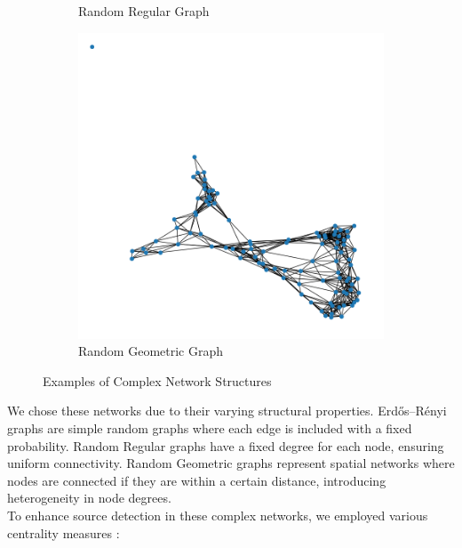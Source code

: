 \begin{figure}[H]
\begin{subfigure}{0.3\textwidth}
        \caption{Random Regular Graph}
        \label{fig:random_regular_graph}
    \end{subfigure}
    \begin{subfigure}{0.3\textwidth}
        \centering
        \includegraphics[width=\textwidth]{random_geometric_graph.png}
        \caption{Random Geometric Graph}
        \label{fig:random_geometric_graph}
    \end{subfigure}
    \caption{Examples of Complex Network Structures}
    \label{fig:network_types}
\end{figure}

We chose these networks due to their varying structural properties. Erdős–Rényi graphs are simple random graphs where each edge is included with a fixed probability. Random Regular graphs have a fixed degree for each node, ensuring uniform connectivity. Random Geometric graphs represent spatial networks where nodes are connected if they are within a certain distance, introducing heterogeneity in node degrees.\\

To enhance source detection in these complex networks, we employed various centrality measures \cite{jiang2017}:

